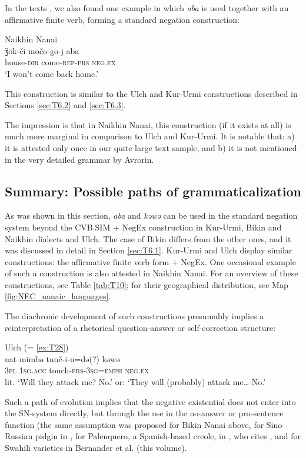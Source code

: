 \documentclass[output=paper]{langscibook}
\begin{document}
In the texts \citep{avrorin1986a}, we also found one example in which \textit{aba} is used together with an affirmative finite verb, forming a standard negation construction:

\ea Naikhin Nanai \label{ex:T31}\\
	\gll ǯōk-či	močo-go-j	aba\\
	house-\textsc{dir}	come-\textsc{rep-prs}	\textsc{neg.ex}\\
	\glt `I won’t come back home.' \citep[192, text]{avrorin1986a}
\z

This construction is similar to the Ulch and Kur-Urmi constructions described in Sections \ref{sec:T6.2} and \ref{sec:T6.3}.

The impression is that in Naikhin Nanai, this construction (if it exists at all) is much more marginal in comparison to Ulch and Kur-Urmi. It is notable that: a) it is attested only once in our quite large text sample, and b) it is not mentioned in the very detailed grammar by Avrorin.

\subsection{Summary: Possible paths of grammaticalization}\label{sec:T6.5}

As was shown in this section, \textit{aba} and \textit{kəwə} can be used in the standard negation system beyond the CVB.SIM + NegEx construction in Kur-Urmi, Bikin and Naikhin dialects and Ulch. The case of Bikin differs from the other ones, and it was discussed in detail in Section \ref{sec:T6.1}. Kur-Urmi and Ulch display similar constructions: the affirmative finite verb form + NegEx. One occasional example of such a construction is also attested in Naikhin Nanai. For an overview of these constructions, see Table \ref{tab:T10}; for their geographical distribution, see Map \ref{fig:NEC_nanaic_languages}.

The diachronic development of such constructions presumably implies a reinterpretation of a rhetorical question-answer or self-correction structure:

\ea Ulch (= \ref{ex:T28}) \label{ex:}\\
	\gll nat	mimbə	tunč-i-n=də(?)		kəwə\\
	\textsc{3pl}	\textsc{1sg.acc}	touch-\textsc{prs-3sg=emph}	\textsc{neg.ex}\\
	\glt lit. `Will they attack me? No.’ or: `They will (probably) attack me… No.’
\z

Such a path of evolution implies that the negative existential does not enter into the SN-system directly, but through the use in the no-answer or pro-sentence function (the same assumption was proposed for Bikin Nanai above, for Sino-Russian pidgin in \citet[155-156]{Veselinova2016}, for Palenquero, a Spanish-based creole, in \citet[21]{Croft1991}, who cites \citet{Schwegler1988}, and for Swahili varieties in Bernander et al. (this volume).
\end{document}
